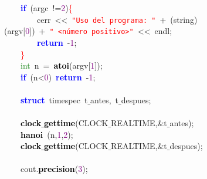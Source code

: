 \mbox{}\ \ \ \ \textbf{\textcolor{Blue}{if}}\ \textcolor{BrickRed}{(}argc\ \textcolor{BrickRed}{!=}\textcolor{Purple}{2}\textcolor{BrickRed}{)}\textcolor{Red}{\{} \\
\mbox{}\ \ \ \ \ \ \ \ cerr\ \textcolor{BrickRed}{\textless{}\textless{}}\ \texttt{\textcolor{Red}{"{}Uso\ del\ programa:\ "{}}}\ \textcolor{BrickRed}{+}\ \textcolor{BrickRed}{(}string\textcolor{BrickRed}{)(}argv\textcolor{BrickRed}{[}\textcolor{Purple}{0}\textcolor{BrickRed}{])}\ \textcolor{BrickRed}{+}\ \texttt{\textcolor{Red}{"{}\ \textless{}número\ positivo\textgreater{}"{}}}\ \textcolor{BrickRed}{\textless{}\textless{}}\ endl\textcolor{BrickRed}{;}\ \  \\
\mbox{}\ \ \ \ \ \ \ \ \textbf{\textcolor{Blue}{return}}\ \textcolor{BrickRed}{-}\textcolor{Purple}{1}\textcolor{BrickRed}{;} \\
\mbox{}\ \ \ \ \textcolor{Red}{\}} \\
\mbox{}\ \ \ \ \textcolor{ForestGreen}{int}\ n\ \textcolor{BrickRed}{=}\ \textbf{\textcolor{Black}{atoi}}\textcolor{BrickRed}{(}argv\textcolor{BrickRed}{[}\textcolor{Purple}{1}\textcolor{BrickRed}{]);}\ \ \ \  \\
\mbox{}\ \ \ \ \textbf{\textcolor{Blue}{if}}\ \textcolor{BrickRed}{(}n\textcolor{BrickRed}{\textless{}}\textcolor{Purple}{0}\textcolor{BrickRed}{)}\ \textbf{\textcolor{Blue}{return}}\ \textcolor{BrickRed}{-}\textcolor{Purple}{1}\textcolor{BrickRed}{;} \\
\mbox{} \\
\mbox{}\ \ \ \ \textbf{\textcolor{Blue}{struct}}\ \textcolor{TealBlue}{timespec}\ t$\_$antes\textcolor{BrickRed}{,}\ t$\_$despues\textcolor{BrickRed}{;} \\
\mbox{}\ \ \ \  \\
\mbox{}\ \ \ \ \textbf{\textcolor{Black}{clock$\_$gettime}}\textcolor{BrickRed}{(}CLOCK$\_$REALTIME\textcolor{BrickRed}{,\&}t$\_$antes\textcolor{BrickRed}{);} \\
\mbox{}\ \ \ \ \textbf{\textcolor{Black}{hanoi}}\ \textcolor{BrickRed}{(}n\textcolor{BrickRed}{,}\textcolor{Purple}{1}\textcolor{BrickRed}{,}\textcolor{Purple}{2}\textcolor{BrickRed}{);} \\
\mbox{}\ \ \ \ \textbf{\textcolor{Black}{clock$\_$gettime}}\textcolor{BrickRed}{(}CLOCK$\_$REALTIME\textcolor{BrickRed}{,\&}t$\_$despues\textcolor{BrickRed}{);} \\
\mbox{}\ \ \ \  \\
\mbox{}\ \ \ \ cout\textcolor{BrickRed}{.}\textbf{\textcolor{Black}{precision}}\textcolor{BrickRed}{(}\textcolor{Purple}{3}\textcolor{BrickRed}{);} \\
